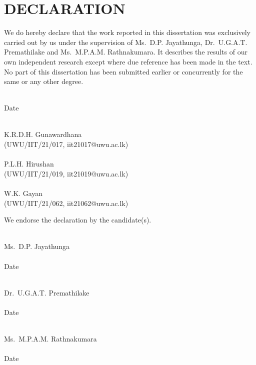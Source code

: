 \section*{DECLARATION}

We do hereby declare that the work reported in this dissertation was exclusively carried out by us under the supervision of Ms.\ D.P. Jayathunga, Dr.\ U.G.A.T. Premathilake and Ms.\ M.P.A.M. Rathnakumara. It describes the results of our own independent research except where due reference has been made in the text. No part of this dissertation has been submitted earlier or concurrently for the same or any other degree.

\vspace{10mm}
\noindent
\begin{minipage}[t]{0.45\textwidth}
    \hrulefill \\[0.5em]
    Date
\end{minipage}%
\hfill
\begin{minipage}[t]{0.45\textwidth}
    \hrulefill \\[0.5em]
    K.R.D.H. Gunawardhana \\
    (UWU/IIT/21/017, iit21017@uwu.ac.lk) \\

    \hrulefill \\[0.5em]
    P.L.H. Hirushan \\
    (UWU/IIT/21/019, iit21019@uwu.ac.lk) \\

    \hrulefill \\[0.5em]
    W.K. Gayan \\
    (UWU/IIT/21/062, iit21062@uwu.ac.lk) \\
\end{minipage}

\noindent We endorse the declaration by the candidate(s).

\vspace{10mm}
\noindent
\begin{minipage}[t]{0.45\textwidth}
    \hrulefill \\[0.5em]
    Ms.\ D.P. Jayathunga \\

    \hrulefill \\[0.5em]
    Date
\end{minipage}%
\hfill
\begin{minipage}[t]{0.45\textwidth}
    \hrulefill \\[0.5em]
    Dr.\ U.G.A.T. Premathilake \\

    \hrulefill \\[0.5em]
    Date
\end{minipage}

\vspace{10mm}
\noindent
\begin{minipage}[t]{0.45\textwidth}
    \hrulefill \\[0.5em]
    Ms.\ M.P.A.M. Rathnakumara \\

    \hrulefill \\[0.5em]
    Date
\end{minipage}

\clearpage
